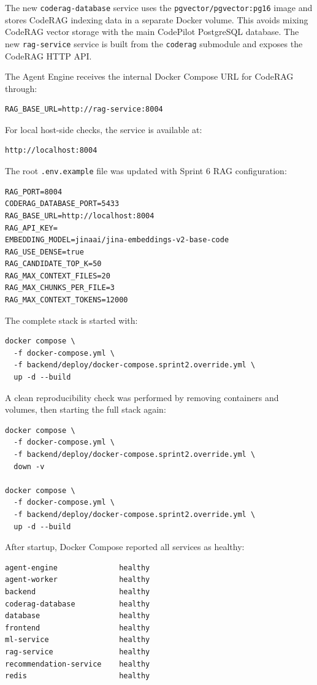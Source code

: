 The new \texttt{coderag-database} service uses the \texttt{pgvector/pgvector:pg16}
image and stores CodeRAG indexing data in a separate Docker volume. This avoids
mixing CodeRAG vector storage with the main CodePilot PostgreSQL database. The
new \texttt{rag-service} service is built from the \texttt{coderag} submodule and
exposes the CodeRAG HTTP API.

The Agent Engine receives the internal Docker Compose URL for CodeRAG through:

\begin{verbatim}
RAG_BASE_URL=http://rag-service:8004
\end{verbatim}

For local host-side checks, the service is available at:

\begin{verbatim}
http://localhost:8004
\end{verbatim}

The root \texttt{.env.example} file was updated with Sprint 6 RAG configuration:

\begin{verbatim}
RAG_PORT=8004
CODERAG_DATABASE_PORT=5433
RAG_BASE_URL=http://localhost:8004
RAG_API_KEY=
EMBEDDING_MODEL=jinaai/jina-embeddings-v2-base-code
RAG_USE_DENSE=true
RAG_CANDIDATE_TOP_K=50
RAG_MAX_CONTEXT_FILES=20
RAG_MAX_CHUNKS_PER_FILE=3
RAG_MAX_CONTEXT_TOKENS=12000
\end{verbatim}

The complete stack is started with:

\begin{verbatim}
docker compose \
  -f docker-compose.yml \
  -f backend/deploy/docker-compose.sprint2.override.yml \
  up -d --build
\end{verbatim}

A clean reproducibility check was performed by removing containers and volumes,
then starting the full stack again:

\begin{verbatim}
docker compose \
  -f docker-compose.yml \
  -f backend/deploy/docker-compose.sprint2.override.yml \
  down -v

docker compose \
  -f docker-compose.yml \
  -f backend/deploy/docker-compose.sprint2.override.yml \
  up -d --build
\end{verbatim}

After startup, Docker Compose reported all services as healthy:

\begin{verbatim}
agent-engine              healthy
agent-worker              healthy
backend                   healthy
coderag-database          healthy
database                  healthy
frontend                  healthy
ml-service                healthy
rag-service               healthy
recommendation-service    healthy
redis                     healthy
\end{verbatim}

